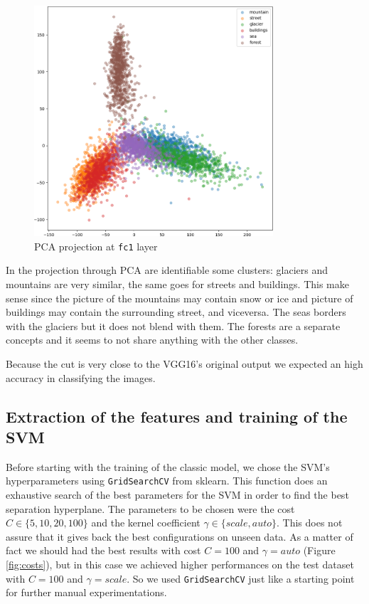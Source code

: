 \documentclass[compsoc]{IEEEtran}
\begin{document}
\begin{figure}[ht!]
\centering                                                                        
\includegraphics[width=3.5in]{../images/pca-1.png}
\captionsetup{justification=centering}                                                                                         
\caption{PCA projection at \texttt{fc1} layer}
\label{fig:pca1}                                                                                                                               
\end{figure}

In the projection through PCA are identifiable some clusters: glaciers and mountains are very similar, the same goes for streets and buildings. This make sense since the picture of the mountains may contain snow or ice and picture of buildings may contain the surrounding street, and viceversa. The seas borders with the glaciers but it does not blend with them. The forests are a separate concepts and it seems to not share anything with the other classes. \par
Because the cut is very close to the VGG16's original output we expected an high accuracy in classifying the images.




\subsection{Extraction of the features and training of the SVM}
Before starting with the training of the classic model, we chose the SVM's hyperparameters using \texttt{GridSearchCV} from sklearn. This function does an exhaustive search of the best parameters for the SVM in order to find the best separation hyperplane. The parameters to be chosen were the cost $C \in \{5, 10, 20, 100\}$ and the kernel coefficient $\gamma \in \{scale, auto\}$. This does not assure that it gives back the best configurations on unseen data. As a matter of fact we should had the best results with cost $C=100$ and $\gamma=auto$ (Figure \ref{fig:costs}), but in this case we achieved higher performances on the test dataset with $C=100$ and $\gamma=scale$. So we used \texttt{GridSearchCV} just like a starting point for further manual experimentations.
\end{document}
